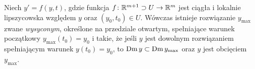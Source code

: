 \begin{theorem}
  Niech $y' = f(y,t)$, gdzie funkcja $f \colon \mathbb{R}^{m+1} \supset U \to \mathbb{R}^m$ jest ciągła i lokalnie
  lipszycowska względem $y$ oraz $(y_0, t_0) \in U$. Wówczas istnieje rozwiązanie $y_{\mathrm{max}}$ zwane
  \emph{wysyconym}, określone na przedziale otwartym, spełniające warunek początkowy $y_{\mathrm{max}}(t_0)
  = y_0$ i takie, że jeśli $y$ jest dowolnym rozwiązaniem spełniającym warunek $y(t_0) = y_0$, to
  $\operatorname{Dm} y \subset \operatorname{Dm} y_{\mathrm{max}}$ oraz $y$ jest obcięciem $y_{\mathrm{max}}$.
\end{theorem}


















